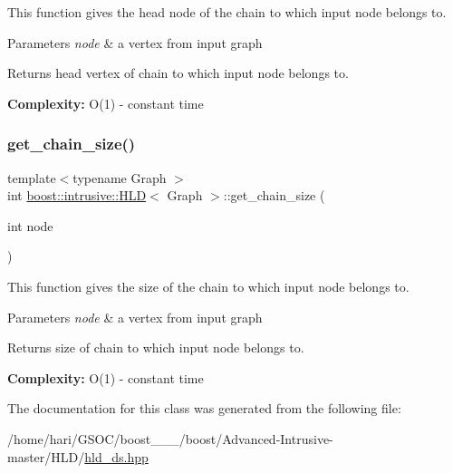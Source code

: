 \begin{DoxyItemize}
\item This function gives the head node of the chain to which input node belongs to.  
\end{DoxyItemize}
\begin{DoxyParams}{Parameters}
{\em node} & a vertex from input graph \\
\hline
\end{DoxyParams}
\begin{DoxyReturn}{Returns}
head vertex of chain to which input node belongs to. 
\end{DoxyReturn}


{\bfseries  Complexity\+: } O(1) -\/ constant time \mbox{\label{classboost_1_1intrusive_1_1HLD_a52a0f91efab2e5fcee4e715dffb114cf}} 
\subsubsection{\texorpdfstring{get\+\_\+chain\+\_\+size()}{get\_chain\_size()}}
{\footnotesize\ttfamily template$<$typename Graph $>$ \\
int \hyperlink{classboost_1_1intrusive_1_1HLD}{boost\+::intrusive\+::\+H\+LD}$<$ Graph $>$\+::get\+\_\+chain\+\_\+size (\begin{DoxyParamCaption}\item[{int}]{node }\end{DoxyParamCaption})\hspace{0.3cm}{\ttfamily [inline]}}


\begin{DoxyItemize}
\item This function gives the size of the chain to which input node belongs to.  
\end{DoxyItemize}
\begin{DoxyParams}{Parameters}
{\em node} & a vertex from input graph \\
\hline
\end{DoxyParams}
\begin{DoxyReturn}{Returns}
size of chain to which input node belongs to. 
\end{DoxyReturn}


{\bfseries  Complexity\+: } O(1) -\/ constant time 

The documentation for this class was generated from the following file\+:\begin{DoxyCompactItemize}
\item 
/home/hari/\+G\+S\+O\+C/boost\+\_\+\_\+\_/boost/\+Advanced-\/\+Intrusive-\/master/\+H\+L\+D/\hyperlink{hld__ds_8hpp}{hld\+\_\+ds.\+hpp}\end{DoxyCompactItemize}
